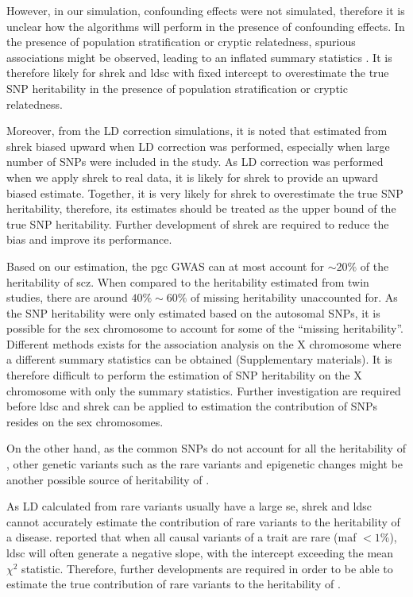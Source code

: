 	However, in our simulation, confounding effects were not simulated, therefore it is unclear how the algorithms will perform in the presence of confounding effects.
	In the presence of population stratification or cryptic relatedness, spurious associations might be observed, leading to an inflated summary statistics \citep{Zheng2006}.
	It is therefore likely for \gls{shrek} and \gls{ldsc} with fixed intercept to overestimate the true \gls{SNP} heritability in the presence of population stratification or cryptic relatedness.
	
	Moreover, from the \gls{LD} correction simulations, it is noted that estimated from \gls{shrek} biased upward when \gls{LD} correction was performed, especially when large number of \glspl{SNP} were included in the study.
	As \gls{LD} correction was performed when we apply \gls{shrek} to real data, it is likely for \gls{shrek} to provide an upward biased estimate.
	Together, it is very likely for \gls{shrek} to overestimate the true \gls{SNP} heritability, therefore, its estimates should be treated as the upper bound of the true \gls{SNP} heritability. 
	Further development of \gls{shrek} are required to reduce the bias and improve its performance. 
	
	Based on our estimation, the \gls{pgc}  \gls{GWAS} can at most account for $\sim20\%$ of the heritability of \gls{scz}.
	When compared to the heritability estimated from twin studies, there are around $40\%\sim60\%$ of missing heritability unaccounted for. 
	As the \gls{SNP} heritability were only estimated based on the autosomal \glspl{SNP}, it is possible for the sex chromosome to account for some of the ``missing heritability''.
	Different methods exists for the association analysis on the X chromosome where a different summary statistics can be obtained \citep{Wong2014} (Supplementary materials).
	It is therefore difficult to perform the estimation of \gls{SNP} heritability on the X chromosome with only the summary statistics. 
	Further investigation are required before \gls{ldsc} and \gls{shrek} can be applied to estimation the contribution of \glspl{SNP} resides on the sex chromosomes.
	
	On the other hand, as the common \glspl{SNP} do not account for all the heritability of , other genetic variants such as the rare variants and epigenetic changes might be another possible source of heritability of .
	
	As \gls{LD} calculated from rare variants usually have a large \gls{se}, \gls{shrek} and \gls{ldsc} cannot accurately estimate the contribution of rare variants to the heritability of a disease. 
	\citet{Bulik-Sullivan2015} reported that when all causal variants of a trait are rare (\gls{maf} $<1\%$), \gls{ldsc} will often generate a negative slope, with the intercept exceeding the mean $\chi^2$ statistic.
	Therefore, further developments are required in order to be able to estimate the true contribution of rare variants to the heritability of .
	
